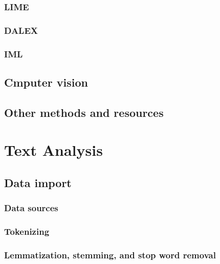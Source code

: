 \documentclass[
]{book}
\begin{document}
\hypertarget{lime}{%
\subsection{LIME}\label{lime}}

\hypertarget{dalex}{%
\subsection{DALEX}\label{dalex}}

\hypertarget{iml}{%
\subsection{IML}\label{iml}}

\hypertarget{cmputer-vision}{%
\section{Cmputer vision}\label{cmputer-vision}}

\hypertarget{other-methods-and-resources}{%
\section{Other methods and resources}\label{other-methods-and-resources}}

\hypertarget{text_analysis}{%
\chapter{Text Analysis}\label{text_analysis}}

\hypertarget{data-import}{%
\section{Data import}\label{data-import}}

\hypertarget{data-sources}{%
\subsection{Data sources}\label{data-sources}}

\hypertarget{tokenizing}{%
\subsection{Tokenizing}\label{tokenizing}}

\hypertarget{lemmatization-stemming-and-stop-word-removal}{%
\subsection{Lemmatization, stemming, and stop word removal}\label{lemmatization-stemming-and-stop-word-removal}}
\end{document}
